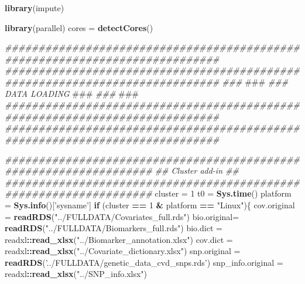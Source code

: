 \documentclass[]{article}
\newenvironment{Shaded}{\begin{snugshade}}{\end{snugshade}}
\newcommand{\AlertTok}[1]{\textcolor[rgb]{0.94,0.16,0.16}{#1}}
\newcommand{\CommentTok}[1]{\textcolor[rgb]{0.56,0.35,0.01}{\textit{#1}}}
\newcommand{\ControlFlowTok}[1]{\textcolor[rgb]{0.13,0.29,0.53}{\textbf{#1}}}
\newcommand{\DecValTok}[1]{\textcolor[rgb]{0.00,0.00,0.81}{#1}}
\newcommand{\KeywordTok}[1]{\textcolor[rgb]{0.13,0.29,0.53}{\textbf{#1}}}
\newcommand{\NormalTok}[1]{#1}
\newcommand{\OperatorTok}[1]{\textcolor[rgb]{0.81,0.36,0.00}{\textbf{#1}}}
\newcommand{\StringTok}[1]{\textcolor[rgb]{0.31,0.60,0.02}{#1}}
\begin{document}
\begin{Shaded}
\begin{Highlighting}[]
\KeywordTok{library}\NormalTok{(impute)}



\KeywordTok{library}\NormalTok{(parallel)}
\NormalTok{cores =}\StringTok{ }\KeywordTok{detectCores}\NormalTok{()}

\CommentTok{############################################################################}
\CommentTok{############################################################################}
\CommentTok{###                                                                      }\AlertTok{###}
\CommentTok{###                             DATA LOADING                             }\AlertTok{###}
\CommentTok{###                                                                      }\AlertTok{###}
\CommentTok{############################################################################}
\CommentTok{############################################################################}



\CommentTok{##################################################################}
\CommentTok{##                        Cluster add-in                        ##}
\CommentTok{##################################################################}
\NormalTok{cluster =}\StringTok{ }\DecValTok{1}
\NormalTok{t0 =}\StringTok{ }\KeywordTok{Sys.time}\NormalTok{()}
\NormalTok{platform =}\StringTok{ }\KeywordTok{Sys.info}\NormalTok{()[}\StringTok{'sysname'}\NormalTok{]}
\ControlFlowTok{if}\NormalTok{ (cluster }\OperatorTok{==}\StringTok{ }\DecValTok{1} \OperatorTok{&}\StringTok{ }\NormalTok{platform }\OperatorTok{==}\StringTok{ "Linux"}\NormalTok{)\{}
\NormalTok{  cov.original =}\StringTok{ }\KeywordTok{readRDS}\NormalTok{(}\StringTok{"../FULLDATA/Covariates_full.rds"}\NormalTok{)}
\NormalTok{  bio.original=}\StringTok{ }\KeywordTok{readRDS}\NormalTok{(}\StringTok{"../FULLDATA/Biomarkers_full.rds"}\NormalTok{)}
\NormalTok{  bio.dict =}\StringTok{ }\NormalTok{readxl}\OperatorTok{::}\KeywordTok{read_xlsx}\NormalTok{(}\StringTok{"../Biomarker_annotation.xlsx"}\NormalTok{)}
\NormalTok{  cov.dict =}\StringTok{ }\NormalTok{readxl}\OperatorTok{::}\KeywordTok{read_xlsx}\NormalTok{(}\StringTok{"../Covariate_dictionary.xlsx"}\NormalTok{)}
\NormalTok{  snp.original =}\StringTok{ }\KeywordTok{readRDS}\NormalTok{(}\StringTok{'../FULLDATA/genetic_data_cvd_snps.rds'}\NormalTok{)}
\NormalTok{  snp_info.original =}\StringTok{ }\NormalTok{readxl}\OperatorTok{::}\KeywordTok{read_xlsx}\NormalTok{(}\StringTok{"../SNP_info.xlsx"}\NormalTok{)}
  

\end{Highlighting}
\end{Shaded}
\end{document}
